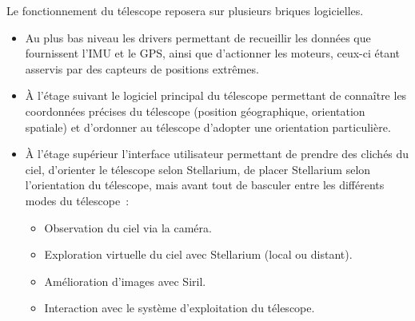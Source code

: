 \vspace{1cm}

Le fonctionnement du télescope reposera sur plusieurs briques logicielles.
\begin{itemize}[label=$\bullet$]
	\item Au plus bas niveau les drivers permettant de recueillir les données que fournissent l'IMU et le GPS, ainsi que d'actionner les moteurs, ceux-ci étant asservis par des capteurs de positions extrêmes.
	\item À l'étage suivant le logiciel principal du télescope permettant de connaître les coordonnées précises du télescope (position géographique, orientation spatiale) et d'ordonner au télescope d'adopter une orientation particulière.
	\item À l'étage supérieur l'interface utilisateur permettant de prendre des clichés du ciel, d'orienter le télescope selon Stellarium, de placer Stellarium selon l'orientation du télescope, mais avant tout de basculer entre les différents modes du télescope~:
	\begin{itemize}
		\item Observation du ciel via la caméra.
		\item Exploration virtuelle du ciel avec Stellarium (local ou distant).
		\item Amélioration d'images avec Siril.
		\item Interaction avec le système d'exploitation du télescope.
		\end{itemize}
	\end{itemize}


